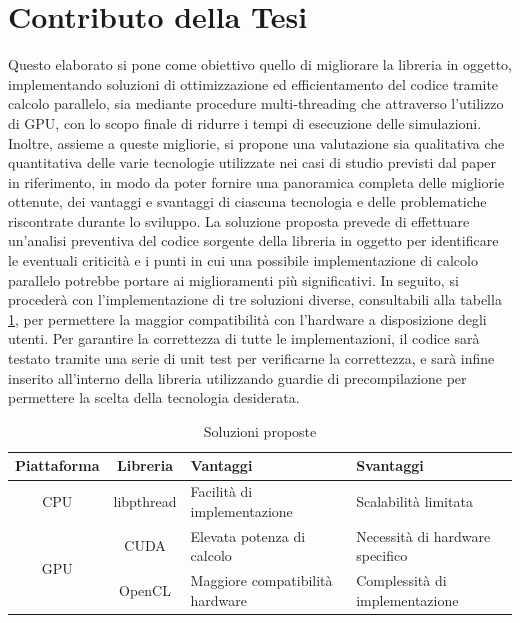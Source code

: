\section{Contributo della Tesi}
\label{sec:contributo}

Questo elaborato si pone come obiettivo quello di migliorare la libreria in
oggetto, implementando soluzioni di ottimizzazione ed efficientamento del codice
tramite calcolo parallelo, sia mediante procedure multi-threading che attraverso
l'utilizzo di GPU, con lo scopo finale di ridurre i tempi di esecuzione delle simulazioni.
Inoltre, assieme a queste migliorie, si propone una valutazione sia qualitativa
che quantitativa delle varie tecnologie utilizzate nei casi di studio previsti
dal paper in riferimento\cite{cooperis}, in modo da poter fornire una panoramica
completa delle migliorie ottenute, dei vantaggi e svantaggi di ciascuna tecnologia
e delle problematiche riscontrate durante lo sviluppo. La soluzione proposta
prevede di effettuare un'analisi preventiva del codice sorgente della libreria
in oggetto per identificare le eventuali criticità e i punti in cui una
possibile implementazione di calcolo parallelo potrebbe portare ai miglioramenti
più significativi. In seguito, si procederà con l'implementazione di tre
soluzioni diverse, consultabili alla tabella \ref{tab:soluzioni}, per permettere
la maggior compatibilità con l'hardware a disposizione degli utenti. Per garantire
la correttezza di tutte le implementazioni, il codice sarà testato tramite una
serie di unit test per verificarne la correttezza, e sarà infine inserito all'interno
della libreria utilizzando guardie di precompilazione per permettere la scelta della
tecnologia desiderata.

\vspace{1em}

\begin{table}[ht]
  \begin{center}
    \begin{tabular}{ |c|c|l|l| }
      \hline
      \textbf{Piattaforma} & \textbf{Libreria}   & \textbf{Vantaggi}               & \textbf{Svantaggi}              \\
      \hline
      CPU                  & libpthread          & Facilità di implementazione     & Scalabilità limitata            \\
      \hline
      \multirow{2}{*}{GPU} & CUDA\cite{cuda}     & Elevata potenza di calcolo      & Necessità di hardware specifico \\
      \cline{2-4}          & OpenCL\cite{opencl} & Maggiore compatibilità hardware & Complessità di implementazione  \\
      \hline
    \end{tabular}
    \caption{Soluzioni proposte}
    \label{tab:soluzioni}
  \end{center}
\end{table}